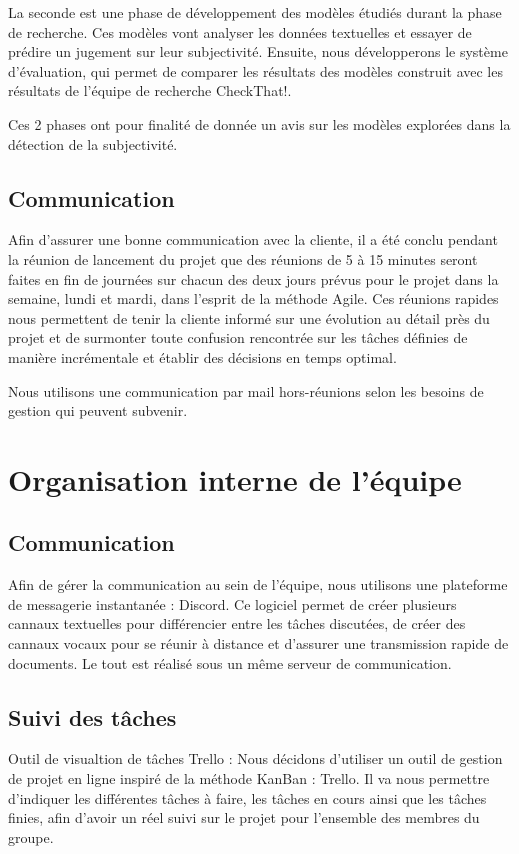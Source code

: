 \documentclass[11pt]{rapport_class}
\begin{document}
La seconde est une phase de développement des modèles étudiés durant la phase de recherche. Ces modèles vont analyser les données textuelles et essayer de prédire un jugement sur leur subjectivité. Ensuite, nous développerons le système d’évaluation, qui permet de comparer les résultats des modèles construit avec les résultats de l’équipe de recherche CheckThat!. 

Ces 2 phases ont pour finalité de donnée un avis sur les modèles explorées dans la détection de la subjectivité.

\subsection{Communication}
Afin d'assurer une bonne communication avec la cliente, il a été conclu pendant la réunion de lancement du projet que des réunions de 5 à 15 minutes seront faites en fin de journées sur chacun des deux jours prévus pour le projet dans la semaine, lundi et mardi, dans l'esprit de la méthode Agile. Ces réunions rapides nous permettent de tenir la cliente informé sur une évolution au détail près du projet et de surmonter toute confusion rencontrée sur les tâches définies de manière incrémentale et établir des décisions en temps optimal.

Nous utilisons une communication par mail hors-réunions selon les besoins de gestion qui peuvent subvenir.


\section{Organisation interne de l'équipe}
\subsection{Communication}
Afin de gérer la communication au sein de l'équipe, nous utilisons une plateforme de messagerie instantanée : Discord. Ce logiciel permet de créer plusieurs cannaux textuelles pour différencier entre les tâches discutées, de créer des cannaux vocaux pour se réunir à distance et d'assurer une transmission rapide de documents. Le tout est réalisé sous un même serveur de communication.

\subsection{Suivi des tâches}
Outil de visualtion de tâches Trello : Nous décidons d’utiliser un outil de gestion de projet en ligne inspiré de la méthode KanBan : Trello. Il va nous permettre d’indiquer les différentes tâches à faire, les tâches en cours ainsi que les tâches finies, afin d’avoir un réel suivi sur le projet pour l’ensemble des membres du groupe.
\end{document}
